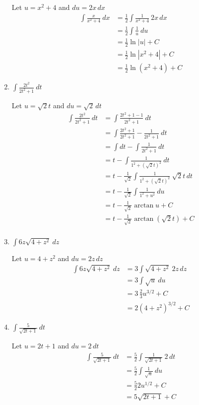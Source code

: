 \documentclass[12pt]{article}
\begin{document}
\begin{enumerate}
Let $u = x^2+4$ and $du = 2x\,dx$
\begin{equation*}
\begin{aligned}
\int \frac{x}{x^2 + 4} \ dx &= \frac{1}{2}\int \frac{1}{x^2+4} \ 2x\,dx \\
&= \frac{1}{2}\int \frac{1}{u} \ du \\
&= \frac{1}{2} \ln |u| + C \\
&= \frac{1}{2} \ln |x^2+4| + C \\
&= \frac{1}{2} \ln (x^2+4) + C
\end{aligned}
\end{equation*}

\item $\displaystyle\int \frac{2t^2}{2t^2+1} \ dt$

Let $u = \sqrt{2}t$ and $du = \sqrt{2}\,dt$
\begin{equation*}
\begin{aligned}
\int \frac{2t^2}{2t^2 + 1} \ dt &= \int \frac{2t^2+1-1}{2t^2+1} \ dt \\
&= \int \frac{2t^2+1}{2t^2+1}-\frac{1}{2t^2+1} \ dt \\
&= \int dt -\int\frac{1}{2t^2+1} \ dt \\
&= t - \int \frac{1}{1^2 + (\sqrt{2}t)^2} \ dt\\
&= t - \frac{1}{\sqrt{2}}\int \frac{1}{1^2 + (\sqrt{2}t)^2} \ \sqrt{2}t\,dt\\
&= t - \frac{1}{\sqrt{2}}\int \frac{1}{1^2 + u^2} \ du\\
&= t - \frac{1}{\sqrt{2}}\arctan u + C\\
&= t - \frac{1}{\sqrt{2}}\arctan(\sqrt{2}t) + C\\
\end{aligned}
\end{equation*}

\item $\displaystyle\int 6z \sqrt{4+z^2} \ dz$

Let $u = 4+z^2$ and $du = 2z\,dz$
\begin{equation*}
\begin{aligned}
\int 6z \sqrt{4+z^2} \ dz &= 3\int \sqrt{4+z^2} \ 2z\,dz \\
&= 3\int \sqrt{u} \ du \\
&= 3\,\frac{2}{3} u^{3/2} + C \\
&= 2 (4+z^2)^{3/2} + C
\end{aligned}
\end{equation*}

\item $\displaystyle\int \frac{5}{\sqrt{2t+1}} \ dt$

Let $u = 2t+1$ and $du = 2\,dt$
\begin{equation*}
\begin{aligned}
\int \frac{5}{\sqrt{2t+1}} \ dt &= \frac{5}{2}\int\frac{1}{\sqrt{2t+1}} \ 2\,dt \\
&= \frac{5}{2}\int\frac{1}{\sqrt{u}} \ du \\
&= \frac{5}{2}2u^{1/2}+ C \\
&= 5\sqrt{2t+1} + C
\end{aligned}
\end{equation*}
\end{enumerate}
\end{document}
